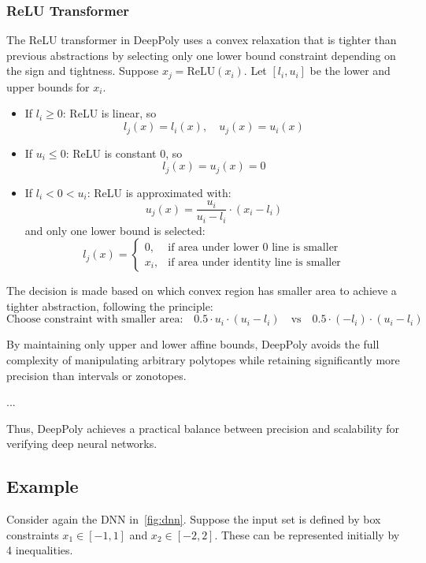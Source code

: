 \documentclass[oneside,11pt,dvipsnames]{book}
\numberwithin{equation}{section}
\theoremstyle{definition}
\theoremstyle{remark}
\begin{document}
\subsubsection{ReLU Transformer}

The ReLU transformer in DeepPoly uses a convex relaxation that is tighter than previous abstractions by selecting only one lower bound constraint depending on the sign and tightness. Suppose \(x_j = \text{ReLU}(x_i)\). Let \([l_i, u_i]\) be the lower and upper bounds for \(x_i\).

\begin{itemize}
    \item If \(l_i \geq 0\): ReLU is linear, so
    \[
    l_j(x) = l_i(x), \quad u_j(x) = u_i(x)
    \]

    \item If \(u_i \leq 0\): ReLU is constant 0, so
    \[
    l_j(x) = u_j(x) = 0
    \]

    \item If \(l_i < 0 < u_i\): ReLU is approximated with:
    \[
    u_j(x) = \frac{u_i}{u_i - l_i} \cdot (x_i - l_i)
    \]
    and only one lower bound is selected:
    \[
    l_j(x) =
    \begin{cases}
        0, & \text{if area under lower 0 line is smaller} \\
        x_i, & \text{if area under identity line is smaller}
    \end{cases}
    \]
\end{itemize}

The decision is made based on which convex region has smaller area to achieve a tighter abstraction, following the principle:
\[
\text{Choose constraint with smaller area:} \quad 0.5 \cdot u_i \cdot (u_i - l_i) \quad \text{vs} \quad 0.5 \cdot (-l_i) \cdot (u_i - l_i)
\]


By maintaining only upper and lower affine bounds, DeepPoly avoids the full complexity of manipulating arbitrary polytopes while retaining significantly more precision than intervals or zonotopes. 

...

Thus, DeepPoly achieves a practical balance between precision and scalability for verifying deep neural networks.

\subsection{Example}

Consider again the DNN in~\autoref{fig:dnn}. Suppose the input set is defined by box constraints \(x_1 \in [-1,1]\) and \(x_2 \in [-2,2]\). These can be represented initially by 4 inequalities.
\end{document}
